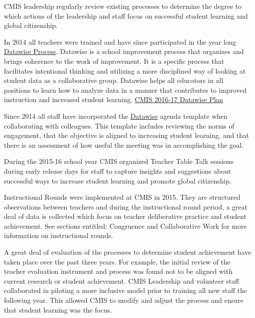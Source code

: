 \begin{findings}
CMIS leadership regularly review existing processes to determine the degree to which actions of the leadership and staff focus on successful student learning and global citizenship.

In 2014 all teachers were trained and have since participated in the year long \href{https://drive.google.com/a/cmis.ac.th/file/d/0B71_pYxcTLo-OExlV0Y5UVFBNVU/view?usp=sharing}{Datawise Process}. Datawise is a school improvement process that organizes and brings coherence to the work of improvement. It is a specific process that facilitates intentional thinking and utilizing a more disciplined way of looking at student data as a collaborative group. Datawise helps all educators in all positions to learn how to analyze data in a manner that contributes to improved instruction and increased student learning. \href{https://docs.google.com/document/d/1TmnCp5qZiZAUMnUmaU32PBn2UGvCMVtFO8r5OsxwNo4/edit}{CMIS 2016-17 Datawise Plan}

Since 2014 all staff  have incorporated the \href{https://docs.google.com/a/cmis.ac.th/document/d/1IFIRIT2wAu1GF2yZ5FSSOdFB3yBKxzx_eCZhdFtroC0/edit?usp=sharing}{Datawise} agenda template when collaborating with colleagues. This template includes reviewing the norms of engagement, that the objective is aligned to increasing student learning, and that there is an assessment of how useful the meeting was in accomplishing the goal.

During the 2015-16 school year CMIS organized Teacher Table Talk sessions during early release days for staff to capture insights and suggestions about successful ways to increase student learning and promote global citizenship.


Instructional Rounds were implemented at CMIS in 2015. They are structured observations between teachers and during the instructional round period, a great deal of data is collected which focus on teacher deliberative practice and student achievement. See sections entitled: Congruence and Collaborative Work for more information on instructional rounds. 


A great deal of evaluation of the processes to determine student achievement have taken place over the past three years. For example, the initial review of the teacher evaluation instrument and process was found not to be aligned with current research or student achievement. CMIS Leadership and volunteer staff collaborated in piloting a more inclusive model prior to training all new staff the following year. This allowed CMIS to modify and adjust the process and ensure that student learning was the focus. 


\end{findings}
